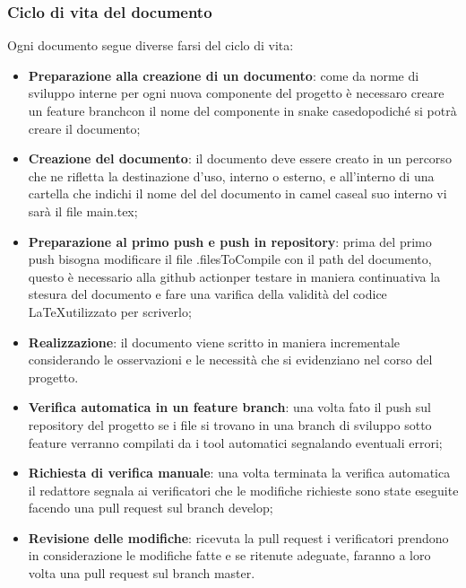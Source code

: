 \subsubsection{Ciclo di vita del documento}
Ogni documento segue diverse farsi del ciclo di vita:
\begin{itemize}
  \item \textbf{Preparazione alla creazione di un documento}: come da norme di
  sviluppo interne per ogni nuova componente del progetto \`e necessaro creare un
  feature branch\glo con il nome del componente in snake case\glo dopodich\'e
  si potr\`a creare il documento;

  \item \textbf{Creazione del documento}: il documento deve essere creato in un
  percorso che ne rifletta la destinazione d'uso, interno o esterno, e
  all'interno di una cartella che indichi il nome del del documento in
  camel case\glo al suo interno vi sar\`a il file main.tex;

  \item \textbf{Preparazione al primo push e push in repository}: prima del primo
   push bisogna modificare il file .filesToCompile con il path del documento,
   questo \`e necessario alla github action\glo per testare in maniera continuativa
   la stesura del documento e fare una varifica della validit\`a del codice
   \LaTeX \space utilizzato per scriverlo;

  \item \textbf{Realizzazione}: il documento viene scritto in maniera incrementale
  considerando le osservazioni e le necessit\`a che si evidenziano nel corso del
  progetto.

  \item \textbf{Verifica automatica in un feature branch}: una volta fato il push
  sul repository del progetto se i file si trovano in una branch di sviluppo
  sotto feature verranno compilati da i tool automatici segnalando eventuali errori;

  \item \textbf{Richiesta di verifica manuale}: una volta terminata la verifica
  automatica il redattore segnala ai verificatori che le modifiche richieste
  sono state eseguite facendo una pull request sul branch develop;

  \item \textbf{Revisione delle modifiche}: ricevuta la pull request i verificatori
  prendono in considerazione le modifiche fatte e se ritenute adeguate, faranno a
  loro volta una pull request sul branch master.


\end{itemize}
